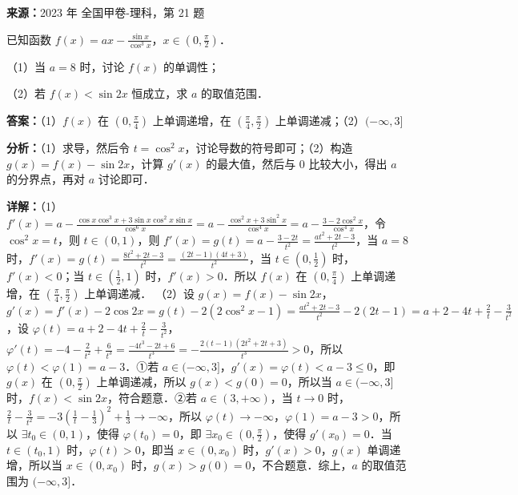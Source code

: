 \begin{question}[points=12]
\textbf{来源：}2023 年 全国甲卷-理科，第 21 题\par
已知函数 $f(x) = ax - \frac{\sin x}{\cos^3 x}$，$x \in \left(0, \frac{\pi}{2}\right)$．

（1）当 $a=8$ 时，讨论 $f(x)$ 的单调性；

（2）若 $f(x) < \sin 2x$ 恒成立，求 $a$ 的取值范围．
\begin{solution}
\textbf{答案：}（1）$f(x)$ 在 $(0,\frac{\pi}{4})$ 上单调递增，在 $(\frac{\pi}{4},\frac{\pi}{2})$ 上单调递减；（2）$(-\infty,3]$

\textbf{分析：}（1）求导，然后令 $t=\cos^2 x$，讨论导数的符号即可；（2）构造 $g(x)=f(x)-\sin 2x$，计算 $g'(x)$ 的最大值，然后与 0 比较大小，得出 $a$ 的分界点，再对 $a$ 讨论即可．

\textbf{详解：}（1）$f'(x) = a - \frac{\cos x \cos^3 x + 3\sin x \cos^2 x \sin x}{\cos^6 x} = a - \frac{\cos^2 x + 3\sin^2 x}{\cos^4 x} = a - \frac{3-2\cos^2 x}{\cos^4 x}$，令 $\cos^2 x = t$，则 $t\in(0,1)$，则 $f'(x) = g(t) = a - \frac{3-2t}{t^2} = \frac{at^2+2t-3}{t^2}$，当 $a=8$ 时，$f'(x) = g(t) = \frac{8t^2+2t-3}{t^2} = \frac{(2t-1)(4t+3)}{t^2}$，当 $t\in(0,\frac{1}{2})$ 时，$f'(x)<0$；当 $t\in(\frac{1}{2},1)$ 时，$f'(x)>0$．所以 $f(x)$ 在 $(0,\frac{\pi}{4})$ 上单调递增，在 $(\frac{\pi}{4},\frac{\pi}{2})$ 上单调递减．
（2）设 $g(x)=f(x)-\sin 2x$，$g'(x)=f'(x)-2\cos 2x = g(t) - 2(2\cos^2 x -1) = \frac{at^2+2t-3}{t^2} - 2(2t-1) = a+2 - 4t + \frac{2}{t} - \frac{3}{t^2}$，设 $\varphi(t)=a+2-4t+\frac{2}{t}-\frac{3}{t^2}$，$\varphi'(t)=-4-\frac{2}{t^2}+\frac{6}{t^3} = \frac{-4t^3-2t+6}{t^3} = -\frac{2(t-1)(2t^2+2t+3)}{t^3}>0$，所以 $\varphi(t)<\varphi(1)=a-3$．①若 $a\in(-\infty,3]$，$g'(x)=\varphi(t)<a-3\le0$，即 $g(x)$ 在 $(0,\frac{\pi}{2})$ 上单调递减，所以 $g(x)<g(0)=0$，所以当 $a\in(-\infty,3]$ 时，$f(x)<\sin 2x$，符合题意．②若 $a\in(3,+\infty)$，当 $t\to0$ 时，$\frac{2}{t}-\frac{3}{t^2} = -3\left(\frac{1}{t}-\frac{1}{3}\right)^2+\frac{1}{3} \to -\infty$，所以 $\varphi(t)\to -\infty$，$\varphi(1)=a-3>0$，所以 $\exists t_0\in(0,1)$，使得 $\varphi(t_0)=0$，即 $\exists x_0\in(0,\frac{\pi}{2})$，使得 $g'(x_0)=0$．当 $t\in(t_0,1)$ 时，$\varphi(t)>0$，即当 $x\in(0,x_0)$ 时，$g'(x)>0$，$g(x)$ 单调递增，所以当 $x\in(0,x_0)$ 时，$g(x)>g(0)=0$，不合题意．综上，$a$ 的取值范围为 $(-\infty,3]$．
\end{solution}
\end{question}

